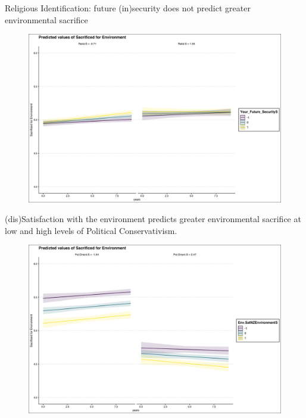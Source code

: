 \documentclass{beamer}
\begin{document}
\begin{frame}{Religious Identification: future (in)security  does not predict greater environmental sacrifice}
\begin{figure}
\includegraphics[width=.8\textwidth,height=\textheight,keepaspectratio]{Figures/X_SACRIFICEMADE_Your_Future_SecurityS_Relid.S.png}
\end{figure}
\end{frame}

\begin{frame}{(dis)Satisfaction with the environment predicts greater environmental sacrifice at low and high levels of Political Conservativism.}
\begin{figure}
\includegraphics[width=.8\textwidth,height=\textheight,keepaspectratio]{Figures/X_SACRIFICEMADE_Env.SatNZEnvironmentS_Pol.Orient.S.png}
\end{figure}
\end{frame}
\end{document}
